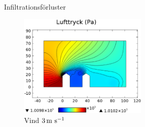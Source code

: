 \begin{frame}{Infiltrationsförluster}

\begin{figure}[hpbt]
\centering
\includegraphics[width=233px]{images/pressure3ms.eps}
\caption*{\label{fig:windpressure}Vind $\unit[3]{m~s^{-1}}$}
\end{figure}

\end{frame}


